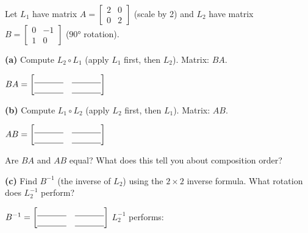 \documentclass[10pt]{article}
\begin{document}
\begin{tcolorbox}[colback=white, colframe=black!40,
    title=\textbf{Tier E --- Composition Order and Inverse},
    fonttitle=\bfseries, arc=2mm, left=3mm, right=3mm, top=2mm, bottom=2mm]
\small

Let $L_1$ have matrix $A = \begin{bmatrix}2&0\\0&2\end{bmatrix}$
(scale by 2) and $L_2$ have matrix $B = \begin{bmatrix}0&-1\\1&0\end{bmatrix}$
($90°$ rotation).

\vspace{0.08in}
\textbf{(a)} Compute $L_2 \circ L_1$ (apply $L_1$ first, then $L_2$). Matrix: $BA$.

$BA = \begin{bmatrix}\blank{1.2cm}&\blank{1.2cm}\\\blank{1.2cm}&\blank{1.2cm}\end{bmatrix}$

\vspace{0.1in}
\textbf{(b)} Compute $L_1 \circ L_2$ (apply $L_2$ first, then $L_1$). Matrix: $AB$.

$AB = \begin{bmatrix}\blank{1.2cm}&\blank{1.2cm}\\\blank{1.2cm}&\blank{1.2cm}\end{bmatrix}$

\vspace{0.06in}
Are $BA$ and $AB$ equal? \blank{1.5cm} \quad What does this tell you about composition order? \blank{5cm}

\vspace{0.1in}
\textbf{(c)} Find $B^{-1}$ (the inverse of $L_2$) using the $2\times2$ inverse formula.
What rotation does $L_2^{-1}$ perform?

$B^{-1} = \begin{bmatrix}\blank{1.2cm}&\blank{1.2cm}\\\blank{1.2cm}&\blank{1.2cm}\end{bmatrix}$
\qquad $L_2^{-1}$ performs: \blank{5cm}

\end{tcolorbox}
\end{document}
